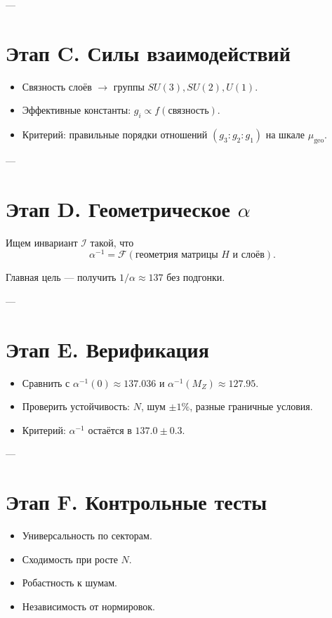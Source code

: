 \documentclass[a4paper,12pt]{article}
\begin{document}
---

\section*{Этап C. Силы взаимодействий}
\begin{itemize}
  \item Связность слоёв $\to$ группы $SU(3),SU(2),U(1)$.
  \item Эффективные константы: $g_i \propto f(\text{связность})$.
  \item Критерий: правильные порядки отношений $(g_3:g_2:g_1)$ на шкале $\mu_{\mathrm{geo}}$.
\end{itemize}

---

\section*{Этап D. Геометрическое $\alpha$}
Ищем инвариант $\mathcal{I}$ такой, что
\[
\alpha^{-1} = \mathcal{F}(\text{геометрия матрицы $H$ и слоёв}).
\]

Главная цель — получить $1/\alpha \approx 137$ без подгонки.

---

\section*{Этап E. Верификация}
\begin{itemize}
  \item Сравнить с $\alpha^{-1}(0)\approx 137.036$ и $\alpha^{-1}(M_Z)\approx 127.95$.
  \item Проверить устойчивость: $N$, шум $\pm 1\%$, разные граничные условия.
  \item Критерий: $\alpha^{-1}$ остаётся в $137.0 \pm 0.3$.
\end{itemize}

---

\section*{Этап F. Контрольные тесты}
\begin{itemize}
  \item Универсальность по секторам.
  \item Сходимость при росте $N$.
  \item Робастность к шумам.
  \item Независимость от нормировок.
\end{itemize}
\end{document}
